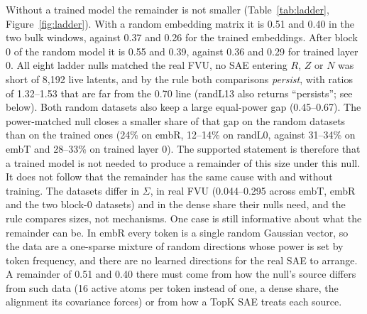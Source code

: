 \documentclass[10pt,twocolumn]{article}
\newcommand{\Sig}{\Sigma}
\begin{document}
Without a trained model the remainder is not smaller (Table~\ref{tab:ladder}, Figure~\ref{fig:ladder}). With a random embedding matrix it is 0.51 and 0.40 in the two bulk windows, against 0.37 and 0.26 for the trained embeddings. After block 0 of the random model it is 0.55 and 0.39, against 0.36 and 0.29 for trained layer 0. All eight ladder nulls matched the real FVU, no SAE entering $R$, $Z$ or $N$ was short of 8,192 live latents, and by the rule both comparisons \emph{persist}, with ratios of 1.32--1.53 that are far from the 0.70 line (randL13 also returns ``persists''; see below). Both random datasets also keep a large equal-power gap (0.45--0.67). The power-matched null closes a smaller share of that gap on the random datasets than on the trained ones (24\% on embR, 12--14\% on randL0, against 31--34\% on embT and 28--33\% on trained layer 0). The supported statement is therefore that a trained model is not needed to produce a remainder of this size under this null. It does not follow that the remainder has the same cause with and without training. The datasets differ in $\Sig$, in real FVU (0.044--0.295 across embT, embR and the two block-0 datasets) and in the dense share their nulls need, and the rule compares sizes, not mechanisms. One case is still informative about what the remainder can be. In embR every token is a single random Gaussian vector, so the data are a one-sparse mixture of random directions whose power is set by token frequency, and there are no learned directions for the real SAE to arrange. A remainder of 0.51 and 0.40 there must come from how the null's source differs from such data (16 active atoms per token instead of one, a dense share, the alignment its covariance forces) or from how a TopK SAE treats each source.
\end{document}
